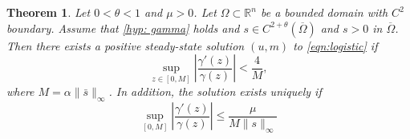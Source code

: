 \documentclass{article}
\newtheorem{theorem}{Theorem}[section]
\begin{document}
\begin{theorem}
    Let $0<\theta<1$ and $\mu>0$. Let $\Omega\subset \mathbb{R}^n$ be a bounded domain with $C^{2}$ boundary. Assume that \eqref{hyp: gamma} holds and $s\in C^{2+\theta}(\overline{\Omega})$ and $s>0$ in $\overline \Omega$. Then there exists a positive steady-state solution $(u,m)$ to \eqref{eqn:logistic} if
    \begin{equation}\label{exist cond:gamma}
     \sup_{z\in [0,M]}\left|\frac{\gamma'(z)}{\gamma(z)}\right|<\frac{4}{M},
    \end{equation} where $M=\alpha\|\bar s\|_\infty$. In addition, the solution exists uniquely if 
    \begin{equation}
        \label{uniq cond:gamma}
        \sup\limits_{[0,M]}\left|\frac{\gamma'(z)}{\gamma(z)}\right|\le \frac{\mu}{M\|s\|_\infty}
    \end{equation}
\end{theorem}
\end{document}
